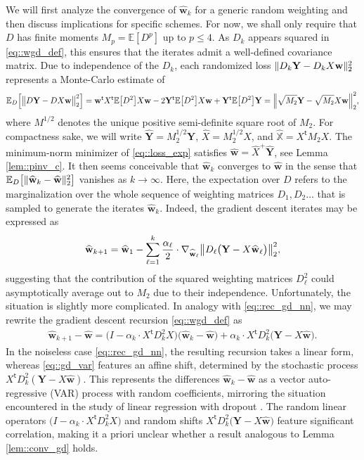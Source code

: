 \documentclass{article}
\newcommand*{\E}{\mathbb{E}} %
\newcommand*{\bbX}{\mathbb{X}}
\newcommand*{\bfY}{\mathbf{Y}}
\newcommand*{\bfw}{\mathbf{w}}
\newcommand*{\pinv}{^{+}}
\newcommand*{\tran}{^{\mathsf{t}}}
\DeclarePairedDelimiter{\norm}{\lVert}{\rVert}
\newcommand{\weight}{\bfw}
\newcommand{\whweight}{\widehat{\bfw}}
\newcommand{\whX}{\widehat{X}}
\newcommand{\whbbX}{\widehat{\bbX}}
\newcommand{\whY}{\widehat{\bfY}}
\begin{document}
We will first analyze the convergence of $\whweight_k$ for a generic random
weighting and then discuss implications for specific schemes. For now, we shall
only require that $D$ has finite moments $M_p = \E[D^p]$ up to $p \leq 4$. As
$D_k$ appears squared in \eqref{eq::wgd_def}, this ensures that the iterates
admit a well-defined covariance matrix. Due to independence of the $D_k$, each
randomized loss $\norm{D_k \bfY - D_k X \weight}_2^2$ represents a Monte-Carlo
estimate of \begin{align}
  \label{eq::loss_exp}
  \E_D\Big[\norm[\big]{D \bfY - D X \weight}_2^2\Big] = \weight\tran X\tran
  \E\big[D^2\big] X \weight - 2 \bfY\tran \E\big[D^2\big] X \weight + \bfY\tran
  \E\big[D^2\big] \bfY = \norm[\Big]{\sqrt{M_2} \bfY - \sqrt{M_2} X
  \weight}_2^2,
\end{align} where $M^{1 / 2}$ denotes the unique positive semi-definite square
root of $M_2$. For compactness sake, we will write $\whY = M_2^{1 / 2} \bfY$,
$\whX = M_2^{1 / 2} X$, and $\whbbX = X\tran M_2 X$. The minimum-norm minimizer
of \eqref{eq::loss_exp} satisfies $\whweight = \whX\pinv \whY$, see Lemma
\ref{lem::pinv_c}. It then seems conceivable that $\whweight_k$ converges to
$\whweight$ in the sense that $\E_D\big[\norm{\whweight_k - \whweight}_2^2\big]$
vanishes as $k \to \infty$. Here, the expectation over $D$ refers to the
marginalization over the whole sequence of weighting matrices $D_1, D_2 \ldots$
that is sampled to generate the iterates $\whweight_k$. Indeed, the gradient
descent iterates may be expressed as \begin{align}
  \label{eq::gd_rw}
  \whweight_{k + 1} = \whweight_1 - \sum_{\ell = 1}^k \dfrac{\alpha_\ell}{2}
  \cdot \nabla_{\whweight_\ell} \norm[\big]{D_\ell \big(\bfY - X
  \whweight_\ell\big)}_2^2,
\end{align} suggesting that the contribution of the squared weighting matrices
$D_\ell^2$ could asymptotically average out to $M_2$ due to their independence.
Unfortunately, the situation is slightly more complicated. In analogy with
\eqref{eq::rec_gd_nn}, we may rewrite the gradient descent recursion
\eqref{eq::wgd_def} as \begin{align}
  \label{eq::gd_var}
  \whweight_{k + 1} - \whweight = \big(I - \alpha_k \cdot X\tran D_k^2 X\big)
  \big(\whweight_k - \whweight\big) + \alpha_k \cdot X\tran D_k^2 \big(\bfY -
  X \whweight\big).
\end{align} In the noiseless case \eqref{eq::rec_gd_nn}, the resulting recursion
takes a linear form, whereas \eqref{eq::gd_var} features an affine shift,
determined by the stochastic process $X\tran D_k^2 (\bfY - X \whweight)$. This
represents the differences $\whweight_k - \whweight$ as a vector auto-regressive
(VAR) process with random coefficients, mirroring the situation encountered in
the study of linear regression with dropout \cite{clara_langer_et_al_2024}. The
random linear operators $\big(I - \alpha_k \cdot X\tran D_k^2 X\big)$ and random
shifts $X\tran D_k^2 \big(\bfY - X \whweight\big)$ feature significant
correlation, making it a priori unclear whether a result analogous to Lemma
\ref{lem::conv_gd} holds.
\end{document}
